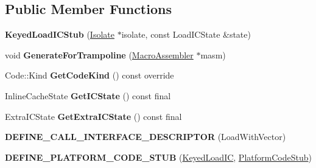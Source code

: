\subsection*{Public Member Functions}
\begin{DoxyCompactItemize}
\item 
{\bfseries Keyed\+Load\+I\+C\+Stub} (\hyperlink{classv8_1_1internal_1_1_isolate}{Isolate} $\ast$isolate, const Load\+I\+C\+State \&state)\hypertarget{classv8_1_1internal_1_1_keyed_load_i_c_stub_a220747f76eb712ae522cbbf592333c6d}{}\label{classv8_1_1internal_1_1_keyed_load_i_c_stub_a220747f76eb712ae522cbbf592333c6d}

\item 
void {\bfseries Generate\+For\+Trampoline} (\hyperlink{classv8_1_1internal_1_1_macro_assembler}{Macro\+Assembler} $\ast$masm)\hypertarget{classv8_1_1internal_1_1_keyed_load_i_c_stub_ade0386b584de6b14616d0c04755d2a83}{}\label{classv8_1_1internal_1_1_keyed_load_i_c_stub_ade0386b584de6b14616d0c04755d2a83}

\item 
Code\+::\+Kind {\bfseries Get\+Code\+Kind} () const  override\hypertarget{classv8_1_1internal_1_1_keyed_load_i_c_stub_a806a4d6c561c05757f8c779b5d548088}{}\label{classv8_1_1internal_1_1_keyed_load_i_c_stub_a806a4d6c561c05757f8c779b5d548088}

\item 
Inline\+Cache\+State {\bfseries Get\+I\+C\+State} () const  final\hypertarget{classv8_1_1internal_1_1_keyed_load_i_c_stub_ab7e04fb1e6ec01a5e395e65228eafb0e}{}\label{classv8_1_1internal_1_1_keyed_load_i_c_stub_ab7e04fb1e6ec01a5e395e65228eafb0e}

\item 
Extra\+I\+C\+State {\bfseries Get\+Extra\+I\+C\+State} () const  final\hypertarget{classv8_1_1internal_1_1_keyed_load_i_c_stub_af856d0335078755c07a8fefd0840528b}{}\label{classv8_1_1internal_1_1_keyed_load_i_c_stub_af856d0335078755c07a8fefd0840528b}

\item 
{\bfseries D\+E\+F\+I\+N\+E\+\_\+\+C\+A\+L\+L\+\_\+\+I\+N\+T\+E\+R\+F\+A\+C\+E\+\_\+\+D\+E\+S\+C\+R\+I\+P\+T\+OR} (Load\+With\+Vector)\hypertarget{classv8_1_1internal_1_1_keyed_load_i_c_stub_a44d06cba7859ff37d289fa810fb37a0e}{}\label{classv8_1_1internal_1_1_keyed_load_i_c_stub_a44d06cba7859ff37d289fa810fb37a0e}

\item 
{\bfseries D\+E\+F\+I\+N\+E\+\_\+\+P\+L\+A\+T\+F\+O\+R\+M\+\_\+\+C\+O\+D\+E\+\_\+\+S\+T\+UB} (\hyperlink{classv8_1_1internal_1_1_keyed_load_i_c}{Keyed\+Load\+IC}, \hyperlink{classv8_1_1internal_1_1_platform_code_stub}{Platform\+Code\+Stub})\hypertarget{classv8_1_1internal_1_1_keyed_load_i_c_stub_a0b9217f200257b0422e3b50372503915}{}\label{classv8_1_1internal_1_1_keyed_load_i_c_stub_a0b9217f200257b0422e3b50372503915}

\end{DoxyCompactItemize}
